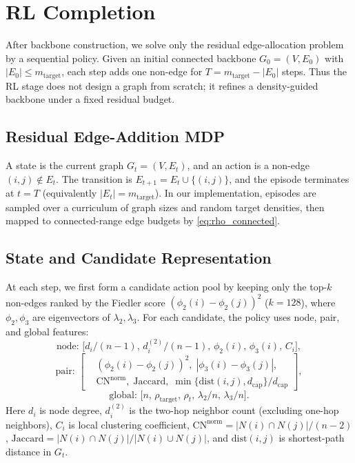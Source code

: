 \documentclass[letterpaper, 10 pt, conference]{ieeeconf}  %
\newcommand{\1}{\mathbf{1}}
\newcommand{\0}{\mathbf{0}}
\begin{document}
\section{RL Completion}
After backbone construction, we solve only the residual edge-allocation problem by a sequential policy.
Given an initial connected backbone \(G_0=(V,E_0)\) with \(|E_0|\le m_{\mathrm{target}}\), each step adds one non-edge for \(T=m_{\mathrm{target}}-|E_0|\) steps.
Thus the RL stage does not design a graph from scratch; it refines a density-guided backbone under a fixed residual budget.

\subsection{Residual Edge-Addition MDP}
A state is the current graph \(G_t=(V,E_t)\), and an action is a non-edge \((i,j)\notin E_t\).
The transition is \(E_{t+1}=E_t\cup\{(i,j)\}\), and the episode terminates at \(t=T\) (equivalently \(|E_t|=m_{\mathrm{target}}\)).
In our implementation, episodes are sampled over a curriculum of graph sizes and random target densities, then mapped to connected-range edge budgets by \eqref{eq:rho_connected}.

\subsection{State and Candidate Representation}
At each step, we first form a candidate action pool by keeping only the top-\(k\) non-edges ranked by the Fiedler score \((\phi_2(i)-\phi_2(j))^2\) (\(k=128\)), where \(\phi_2,\phi_3\) are eigenvectors of \(\lambda_2,\lambda_3\).
For each candidate, the policy uses node, pair, and global features:
\[
\text{node: }\big[d_i/(n-1),\,d_i^{(2)}/(n-1),\,\phi_2(i),\,\phi_3(i),\,C_i\big],
\]
\[
\text{pair: }\left[
\begin{aligned}
&(\phi_2(i)-\phi_2(j))^2,\;|\phi_3(i)-\phi_3(j)|,\\
&\mathrm{CN}^{\mathrm{norm}},\;\mathrm{Jaccard},\;
\min\{\mathrm{dist}(i,j),d_{\mathrm{cap}}\}/d_{\mathrm{cap}}
\end{aligned}
\right],
\]
\[
\text{global: }\big[n,\,\rho_{\mathrm{target}},\,\rho_t,\,\lambda_2/n,\,\lambda_3/n\big].
\]
Here \(d_i\) is node degree, \(d_i^{(2)}\) is the two-hop neighbor count (excluding one-hop neighbors), \(C_i\) is local clustering coefficient, \(\mathrm{CN}^{\mathrm{norm}}=|N(i)\cap N(j)|/(n-2)\), \(\mathrm{Jaccard}=|N(i)\cap N(j)|/|N(i)\cup N(j)|\), and \(\mathrm{dist}(i,j)\) is shortest-path distance in \(G_t\).
\end{document}
